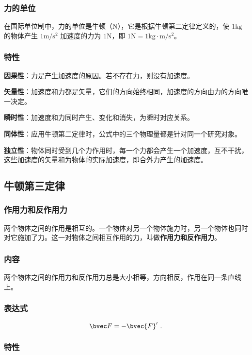 \subsubsection{力的单位}
在国际单位制中，力的单位是牛顿（$\mathrm N$），它是根据牛顿第二定律定义的，使 $1\mathrm{kg}$ 的物体产生 $1\mathrm{m/s^2}$ 加速度的力为 $1\mathrm N$，即 $1\mathrm N=1\mathrm{kg \cdot m/s^2}$。

\subsubsection{特性}
\textbf{因果性}：力是产生加速度的原因。若不存在力，则没有加速度。

\textbf{矢量性}：加速度和力都是矢量，它们的方向始终相同，加速度的方向由力的方向唯一决定。

\textbf{瞬时性}：加速度和力同时产生、变化和消失，为瞬时对应关系。

\textbf{同体性}：应用牛顿第二定律时，公式中的三个物理量都是针对同一个研究对象。

\textbf{独立性}：物体同时受到几个力作用时，每一个力都会产生一个加速度，互不干扰，这些加速度的矢量和为物体的实际加速度，即合外力产生的加速度。

\subsection{牛顿第三定律}
\subsubsection{作用力和反作用力}
两个物体之间的作用是相互的。一个物体对另一个物体施力时，另一个物体也同时对它施加了力。这一对物体之间相互作用的力，叫做\textbf{作用力和反作用力}。

\subsubsection{内容}
两个物体之间的作用力和反作用力总是大小相等，方向相反，作用在同一条直线上。

\subsubsection{表达式}
\begin{equation}
\bvec F=-\bvec {F}'~.
\end{equation}

\subsubsection{特性}

